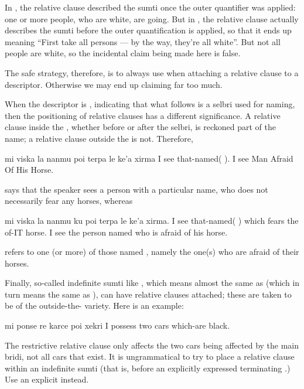 In , the relative clause
    described the sumti once the outer quantifier was applied: one
    or more people, who are white, are going. But in , the relative clause actually
    describes the sumti before the outer quantification is applied,
    so that it ends up meaning ``First take all persons --- by the
    way, they're all white''. But not all people are white, so the
    incidental claim being made here is false.

The safe strategy, therefore, is to always use  when
    attaching a  relative clause to a  descriptor.
    Otherwise we may end up claiming far too much.

When the descriptor is , indicating that what follows
    is a selbri used for naming, then the positioning of relative
    clauses has a different significance. A relative clause inside
    the , whether before or after the selbri, is reckoned
    part of the name; a relative clause outside the  is not.
    Therefore,
\begin{example}
mi viska la nanmu poi terpa le ke'a xirma \n
I see that-named(  ).\n
I see Man Afraid Of His Horse.
\end{example}

{\noindent}says that the speaker sees a person with a particular name, who
    does not necessarily fear any horses, whereas
\begin{example}
mi viska la nanmu ku poi terpa le ke'a xirma.\n
I see that-named(  ) which fears the of-IT horse.\n
I see the person named  who is afraid of his horse.
\end{example}

{\noindent}refers to one (or more) of those named , namely the
    one(s) who are afraid of their horses. 

Finally, so-called indefinite sumti like , which
    means almost the same as  (which in turn means
    the same as ), can have relative clauses
    attached; these are taken to be of the outside-the-
    variety. Here is an example:
\begin{example}
mi ponse re karce  poi xekri\n
I possess two cars which-are black.
\end{example}

The restrictive relative clause only affects the two cars being
    affected by the main bridi, not all cars that exist. It is
    ungrammatical to try to place a relative clause within an
    indefinite sumti (that is, before an explicitly expressed
    terminating .) Use an explicit  instead.



